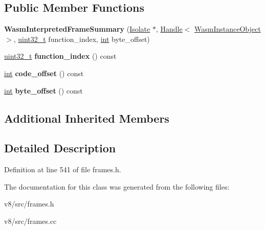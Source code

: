 \subsection*{Public Member Functions}
\begin{DoxyCompactItemize}
\item 
\mbox{\label{classv8_1_1internal_1_1FrameSummary_1_1WasmInterpretedFrameSummary_a570ed41925ed18fc8c48920606f356d2}} 
{\bfseries Wasm\+Interpreted\+Frame\+Summary} (\mbox{\hyperlink{classv8_1_1internal_1_1Isolate}{Isolate}} $\ast$, \mbox{\hyperlink{classv8_1_1internal_1_1Handle}{Handle}}$<$ \mbox{\hyperlink{classv8_1_1internal_1_1WasmInstanceObject}{Wasm\+Instance\+Object}} $>$, \mbox{\hyperlink{classuint32__t}{uint32\+\_\+t}} function\+\_\+index, \mbox{\hyperlink{classint}{int}} byte\+\_\+offset)
\item 
\mbox{\label{classv8_1_1internal_1_1FrameSummary_1_1WasmInterpretedFrameSummary_aa40eaf370d3c2b5abaa1c08d88ac05bc}} 
\mbox{\hyperlink{classuint32__t}{uint32\+\_\+t}} {\bfseries function\+\_\+index} () const
\item 
\mbox{\label{classv8_1_1internal_1_1FrameSummary_1_1WasmInterpretedFrameSummary_a97034270f91165ba8400074075376591}} 
\mbox{\hyperlink{classint}{int}} {\bfseries code\+\_\+offset} () const
\item 
\mbox{\label{classv8_1_1internal_1_1FrameSummary_1_1WasmInterpretedFrameSummary_a2861044038e2f2f15f351c2f0a8feb74}} 
\mbox{\hyperlink{classint}{int}} {\bfseries byte\+\_\+offset} () const
\end{DoxyCompactItemize}
\subsection*{Additional Inherited Members}


\subsection{Detailed Description}


Definition at line 541 of file frames.\+h.



The documentation for this class was generated from the following files\+:\begin{DoxyCompactItemize}
\item 
v8/src/frames.\+h\item 
v8/src/frames.\+cc\end{DoxyCompactItemize}
